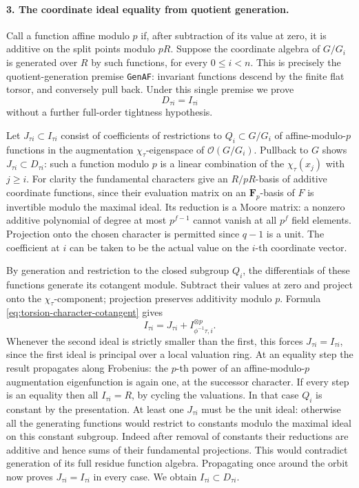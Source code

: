 \paragraph{3. The coordinate ideal equality from quotient generation.}
Call a function affine modulo \(p\) if, after subtraction of
its value at zero, it is additive on the split points modulo
\(pR\). Suppose the coordinate algebra of \(G/G_i\) is generated
over \(R\) by such functions, for every \(0\le i<n\). This is
precisely the quotient-generation premise \texttt{GenAF}:
invariant functions descend by the finite flat torsor, and
conversely pull back. Under this single premise we prove
\begin{equation}\label{eq:torsion-character-coordinate}
 D_{\tau i}=I_{\tau i}
\end{equation}
without a further full-order tightness hypothesis.

Let \(J_{\tau i}\subset I_{\tau i}\) consist of coefficients
of restrictions to \(Q_i\subset G/G_i\) of affine-modulo-\(p\)
functions in the augmentation \(\chi_\tau\)-eigenspace of
\(\mathcal O(G/G_i)\). Pullback to \(G\) shows
\(J_{\tau i}\subset D_{\tau i}\): such a function modulo
\(p\) is a linear combination of the \(\chi_\tau(x_j)\) with
\(j\ge i\). For clarity the fundamental characters give an
\(R/pR\)-basis of additive coordinate functions, since their
evaluation matrix on an \(\mathbf F_p\)-basis of \(F\)
is invertible modulo the maximal ideal. Its reduction is a
Moore matrix: a nonzero additive polynomial of degree at
most \(p^{f-1}\) cannot vanish at all \(p^f\) field elements.
Projection onto the chosen character is permitted since
\(q-1\) is a unit. The coefficient at \(i\) can be taken to
be the actual value on the \(i\)-th coordinate vector.

By generation and restriction to the closed subgroup \(Q_i\),
the differentials of these functions generate its cotangent
module. Subtract their values at zero and project onto the
\(\chi_\tau\)-component; projection preserves additivity
modulo \(p\). Formula \eqref{eq:torsion-character-cotangent}
gives
\[
 I_{\tau i}=J_{\tau i}+I_{\phi^{-1}\tau,i}^{\otimes p}.
\]
Whenever the second ideal is strictly smaller than the first,
this forces \(J_{\tau i}=I_{\tau i}\), since the first ideal is
principal over a local valuation ring. At an equality step
the result propagates along Frobenius: the \(p\)-th power of
an affine-modulo-\(p\) augmentation eigenfunction is again
one, at the successor character. If every step is an equality
then all \(I_{\tau i}=R\), by cycling the valuations. In that
case \(Q_i\) is constant by the presentation. At least one
\(J_{\tau i}\) must be the unit ideal: otherwise all the
generating functions would restrict to constants modulo the
maximal ideal on this constant subgroup. Indeed after removal
of constants their reductions are additive and hence sums
of their fundamental projections. This would contradict
generation of its full residue function algebra. Propagating
once around the orbit now proves \(J_{\tau i}=I_{\tau i}\)
in every case. We obtain \(I_{\tau i}\subset D_{\tau i}\).

